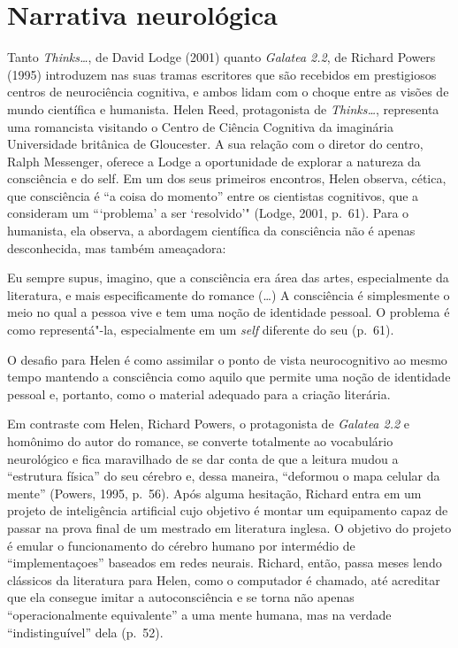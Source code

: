 \section{Narrativa neurológica}

Tanto \emph{Thinks\ldots{}}, de David Lodge (2001) quanto \emph{Galatea 2.2},
de Richard Powers (1995) introduzem nas suas tramas escritores que são
recebidos em prestigiosos centros de neurociência cognitiva, e ambos
lidam com o choque entre as visões de mundo científica e humanista.
Helen Reed, protagonista de \emph{Thinks\ldots{}}, representa uma romancista
visitando o Centro de Ciência Cognitiva da imaginária Universidade
britânica de Gloucester. A sua relação com o diretor do centro, Ralph
Messenger, oferece a Lodge a oportunidade de explorar a natureza da
consciência e do self. Em um dos seus primeiros encontros, Helen
observa, cética, que consciência é ``a coisa do momento'' entre os
cientistas cognitivos, que a consideram um ```problema' a ser
`resolvido'" (Lodge, 2001, p.~61). Para o humanista, ela observa, a
abordagem científica da consciência não é apenas desconhecida, mas
também ameaçadora:

Eu sempre supus, imagino, que a consciência era área das artes,
especialmente da literatura, e mais especificamente do romance (\ldots{}) A
consciência é simplesmente o meio no qual a pessoa vive e tem uma noção
de identidade pessoal. O problema é como representá"-la, especialmente em
um \emph{self} diferente do seu (p.~61).

O desafio para Helen é como assimilar o ponto de vista neurocognitivo ao
mesmo tempo mantendo a consciência como aquilo que permite uma noção de
identidade pessoal e, portanto, como o material adequado para a criação
literária.

Em contraste com Helen, Richard Powers, o protagonista de \emph{Galatea
2.2} e homônimo do autor do romance, se converte totalmente ao
vocabulário neurológico e fica maravilhado de se dar conta de que a
leitura mudou a ``estrutura física'' do seu cérebro e, dessa maneira,
``deformou o mapa celular da mente'' (Powers, 1995, p.~56). Após alguma
hesitação, Richard entra em um projeto de inteligência artificial cujo
objetivo é montar um equipamento capaz de passar na prova final de um
mestrado em literatura inglesa. O objetivo do projeto é emular o
funcionamento do cérebro humano por intermédio de ``implementaçoes''
baseados em redes neurais. Richard, então, passa meses lendo clássicos
da literatura para Helen, como o computador é chamado, até acreditar que
ela consegue imitar a autoconsciência e se torna não apenas
``operacionalmente equivalente'' a uma mente humana, mas na verdade
``indistinguível'' dela (p.~52).

